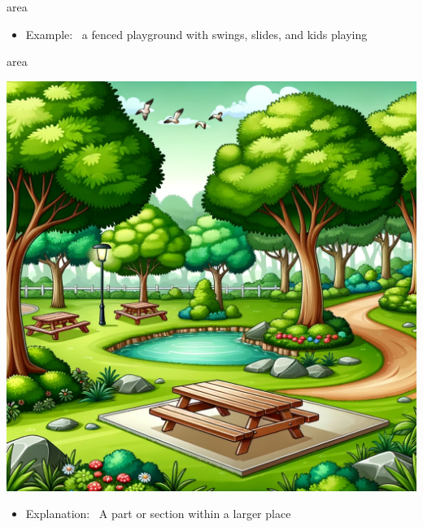 \documentclass[avery5371, grid,frame]{flashcards}
\begin{document}
\begin{flashcard}{area}
\begin{center}
\begin{minipage}[c]{.45\textwidth}
\begin{itemize}
            \item Example: \ a fenced playground with swings, slides, and kids playing
            \end{itemize}
        \end{minipage}
    \end{center}
    \vspace*{\fill}
\end{flashcard}\begin{flashcard}{area}
    \vspace*{\fill}
    \begin{center}
        \begin{minipage}[c]{.45\textwidth}
            \includegraphics[width=\textwidth]{cards/a/area/area - a serene picnic area in a park with trees, benches, and a pond.png}
        \end{minipage}
        \begin{minipage}[c]{.45\textwidth}
            \begin{itemize}\setlength\itemsep{12pt}
            \item Explanation: \ A part or section within a larger place


\end{itemize}
\end{minipage}
\end{center}
\end{flashcard}
\end{document}

